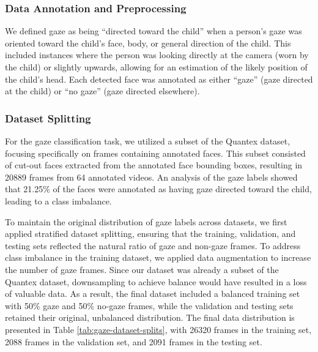 \documentclass[
  man,floatsintext]{apa6}
\begin{document}
\subsubsection{Data Annotation and Preprocessing}\label{data-annotation-and-preprocessing}

We defined gaze as being ``directed toward the child'' when a person's gaze was oriented toward the child's face, body, or general direction of the child. This included instances where the person was looking directly at the camera (worn by the child) or slightly upwards, allowing for an estimation of the likely position of the child's head. Each detected face was annotated as either ``gaze'' (gaze directed at the child) or ``no gaze'' (gaze directed elsewhere).

\subsubsection{Dataset Splitting}\label{dataset-splitting-1}

For the gaze classification task, we utilized a subset of the Quantex dataset, focusing specifically on frames containing annotated faces. This subset consisted of cut-out faces extracted from the annotated face bounding boxes, resulting in 20889 frames from 64 annotated videos. An analysis of the gaze labels showed that 21.25\% of the faces were annotated as having gaze directed toward the child, leading to a class imbalance.

To maintain the original distribution of gaze labels across datasets, we first applied stratified dataset splitting, ensuring that the training, validation, and testing sets reflected the natural ratio of gaze and non-gaze frames. To address class imbalance in the training dataset, we applied data augmentation to increase the number of gaze frames. Since our dataset was already a subset of the Quantex dataset, downsampling to achieve balance would have resulted in a loss of valuable data. As a result, the final dataset included a balanced training set with 50\% gaze and 50\% no-gaze frames, while the validation and testing sets retained their original, unbalanced distribution. The final data distribution is presented in Table \ref{tab:gaze-dataset-splits}, with 26320 frames in the training set, 2088 frames in the validation set, and 2091 frames in the testing set.
\end{document}
